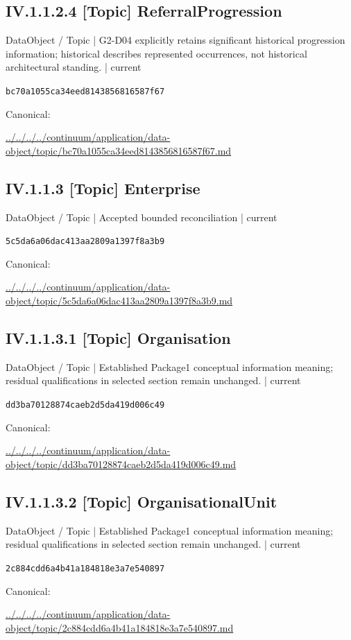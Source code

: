 \documentclass[10pt,a4paper]{article}
\begin{document}
\subsection*{IV.1.1.2.4 [Topic] ReferralProgression}
\label{element-bc70a1055ca34eed8143856816587f67}
{\small DataObject / Topic | G2-D04 explicitly retains significant historical progression information; historical describes represented occurrences, not historical architectural standing. | current}\par
\texttt{bc70a1055ca34eed8143856816587f67}\par
Canonical: \par
{\footnotesize\url{../../../../continuum/application/data-object/topic/bc70a1055ca34eed8143856816587f67.md}}\par
\subsection*{IV.1.1.3 [Topic] Enterprise}
\label{element-5c5da6a06dac413aa2809a1397f8a3b9}
{\small DataObject / Topic | Accepted bounded reconciliation | current}\par
\texttt{5c5da6a06dac413aa2809a1397f8a3b9}\par
Canonical: \par
{\footnotesize\url{../../../../continuum/application/data-object/topic/5c5da6a06dac413aa2809a1397f8a3b9.md}}\par
\subsection*{IV.1.1.3.1 [Topic] Organisation}
\label{element-dd3ba70128874caeb2d5da419d006c49}
{\small DataObject / Topic | Established Package1 conceptual information meaning; residual qualifications in selected section remain unchanged. | current}\par
\texttt{dd3ba70128874caeb2d5da419d006c49}\par
Canonical: \par
{\footnotesize\url{../../../../continuum/application/data-object/topic/dd3ba70128874caeb2d5da419d006c49.md}}\par
\subsection*{IV.1.1.3.2 [Topic] OrganisationalUnit}
\label{element-2c884cdd6a4b41a184818e3a7e540897}
{\small DataObject / Topic | Established Package1 conceptual information meaning; residual qualifications in selected section remain unchanged. | current}\par
\texttt{2c884cdd6a4b41a184818e3a7e540897}\par
Canonical: \par
{\footnotesize\url{../../../../continuum/application/data-object/topic/2c884cdd6a4b41a184818e3a7e540897.md}}\par
\end{document}
